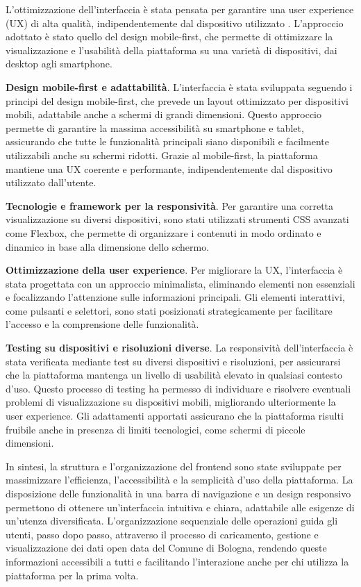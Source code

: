 L'ottimizzazione dell'interfaccia è stata pensata per garantire una user experience (UX) di alta qualità, indipendentemente dal dispositivo utilizzato \cite{w3c2018}. L’approccio adottato è stato quello del design mobile-first, che permette di ottimizzare la visualizzazione e l'usabilità della piattaforma su una varietà di dispositivi, dai desktop agli smartphone.

\textbf{Design mobile-first e adattabilità}. L’interfaccia è stata sviluppata seguendo i principi del design mobile-first, che prevede un layout ottimizzato per dispositivi mobili, adattabile anche a schermi di grandi dimensioni. Questo approccio permette di garantire la massima accessibilità su smartphone e tablet, assicurando che tutte le funzionalità principali siano disponibili e facilmente utilizzabili anche su schermi ridotti. Grazie al mobile-first, la piattaforma mantiene una UX coerente e performante, indipendentemente dal dispositivo utilizzato dall'utente.

\textbf{Tecnologie e framework per la responsività}. Per garantire una corretta visualizzazione su diversi dispositivi, sono stati utilizzati strumenti CSS avanzati come Flexbox, che permette di organizzare i contenuti in modo ordinato e dinamico in base alla dimensione dello schermo.

\textbf{Ottimizzazione della user experience}. Per migliorare la UX, l'interfaccia è stata progettata con un approccio minimalista, eliminando elementi non essenziali e focalizzando l’attenzione sulle informazioni principali. Gli elementi interattivi, come pulsanti e selettori, sono stati posizionati strategicamente per facilitare l'accesso e la comprensione delle funzionalità.

\textbf{Testing su dispositivi e risoluzioni diverse}. La responsività dell’interfaccia è stata verificata mediante test su diversi dispositivi e risoluzioni, per assicurarsi che la piattaforma mantenga un livello di usabilità elevato in qualsiasi contesto d’uso. Questo processo di testing ha permesso di individuare e risolvere eventuali problemi di visualizzazione su dispositivi mobili, migliorando ulteriormente la user experience. Gli adattamenti apportati assicurano che la piattaforma risulti fruibile anche in presenza di limiti tecnologici, come schermi di piccole dimensioni.

In sintesi, la struttura e l’organizzazione del frontend sono state sviluppate per massimizzare l’efficienza, l’accessibilità e la semplicità d'uso della piattaforma. La disposizione delle funzionalità in una barra di navigazione e un design responsivo permettono di ottenere un’interfaccia intuitiva e chiara, adattabile alle esigenze di un'utenza diversificata. L’organizzazione sequenziale delle operazioni guida gli utenti, passo dopo passo, attraverso il processo di caricamento, gestione e visualizzazione dei dati open data del Comune di Bologna, rendendo queste informazioni accessibili a tutti e facilitando l’interazione anche per chi utilizza la piattaforma per la prima volta.



